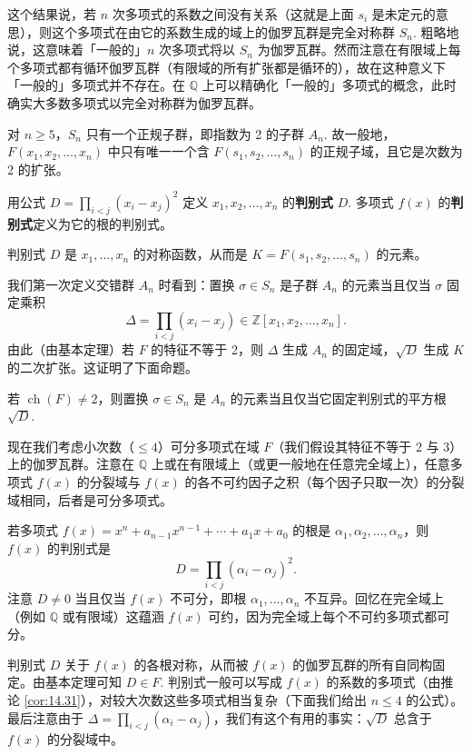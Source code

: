 这个结果说，若 \(n\) 次多项式的系数之间没有关系（这就是上面 \(s_i\) 是未定元的意思），则这个多项式在由它的系数生成的域上的伽罗瓦群是完全对称群 \(S_n\). 粗略地说，这意味着「一般的」\(n\) 次多项式将以 \(S_n\) 为伽罗瓦群。然而注意在有限域上每个多项式都有循环伽罗瓦群（有限域的所有扩张都是循环的），故在这种意义下「一般的」多项式并不存在。在 \(\mathbb{Q}\) 上可以精确化「一般的」多项式的概念，此时确实大多数多项式以完全对称群为伽罗瓦群。

对 \(n \geq 5\)，\(S_n\) 只有一个正规子群，即指数为 2 的子群 \(A_n\). 故一般地，\(F(x_1, x_2, \ldots, x_n)\) 中只有唯一一个含 \(F(s_1, s_2, \ldots, s_n)\) 的正规子域，且它是次数为 2 的扩张。

\begin{definition}
用公式 \(D = \prod_{i<j}(x_i-x_j)^2\) 定义 \(x_1, x_2, \ldots, x_n\) 的\textbf{判别式} \(D\). 多项式 \(f(x)\) 的\textbf{判别式}定义为它的根的判别式。
\end{definition}

判别式 \(D\) 是 \(x_1, \ldots, x_n\) 的对称函数，从而是 \(K = F(s_1, s_2, \ldots, s_n)\) 的元素。

我们第一次定义交错群 \(A_n\) 时看到：置换 \(\sigma \in S_n\) 是子群 \(A_n\) 的元素当且仅当 \(\sigma\) 固定乘积
\[
\Delta = \prod_{i<j}(x_i-x_j) \in \mathbb{Z}[x_1, x_2, \ldots, x_n].
\]
由此（由基本定理）若 \(F\) 的特征不等于 2，则 \(\Delta\) 生成 \(A_n\) 的固定域，\(\sqrt{D}\) 生成 \(K\) 的二次扩张。这证明了下面命题。

\begin{proposition}\label{pro:14.33}
若 \(\operatorname{ch}(F) \neq 2\)，则置换 \(\sigma \in S_n\) 是 \(A_n\) 的元素当且仅当它固定判别式的平方根 \(\sqrt{D}\).
\end{proposition}

现在我们考虑小次数（\(\leq 4\)）可分多项式在域 \(F\)（我们假设其特征不等于 2 与 3）上的伽罗瓦群。注意在 \(\mathbb{Q}\) 上或在有限域上（或更一般地在任意完全域上），任意多项式 \(f(x)\) 的分裂域与 \(f(x)\) 的各不可约因子之积（每个因子只取一次）的分裂域相同，后者是可分多项式。

若多项式 \(f(x) = x^n+a_{n-1}x^{n-1}+\cdots+a_1x+a_0\) 的根是 \(\alpha_1, \alpha_2, \ldots, \alpha_n\)，则 \(f(x)\) 的判别式是
\[
D = \prod_{i<j}(\alpha_i-\alpha_j)^2.
\]
注意 \(D \neq 0\) 当且仅当 \(f(x)\) 不可分，即根 \(\alpha_1, \ldots, \alpha_n\) 不互异。回忆在完全域上（例如 \(\mathbb{Q}\) 或有限域）这蕴涵 \(f(x)\) 可约，因为完全域上每个不可约多项式都可分。

判别式 \(D\) 关于 \(f(x)\) 的各根对称，从而被 \(f(x)\) 的伽罗瓦群的所有自同构固定。由基本定理可知 \(D \in F\). 判别式一般可以写成 \(f(x)\) 的系数的多项式（由推论 \ref{cor:14.31}），对较大次数这些多项式相当复杂（下面我们给出 \(n \leq 4\) 的公式）。最后注意由于 \(\Delta = \prod_{i<j}(\alpha_i-\alpha_j)\)，我们有这个有用的事实：\(\sqrt{D}\) 总含于 \(f(x)\) 的分裂域中。

